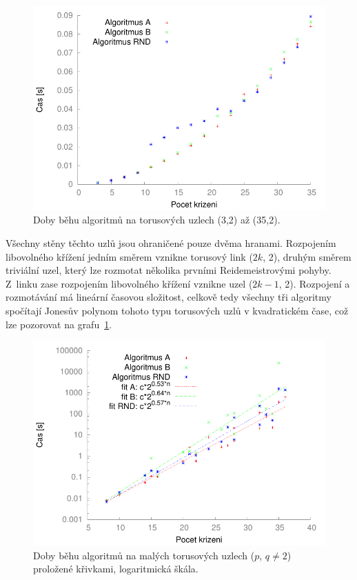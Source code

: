 \begin{figure}[p]\centering
\includegraphics{../img/torus2}
\caption{Doby běhu algoritmů na torusových uzlech (3,2) až (35,2).}
\label{obr03:torus2}
\end{figure}

Všechny stěny těchto uzlů jsou ohraničené pouze dvěma hranami. Rozpojením libovolného křížení jedním směrem vznikne torusový link ($2k$, 2), druhým směrem triviální uzel, který lze rozmotat několika prvními Reidemeistrovými pohyby. Z~linku zase rozpojením libovolného křížení vznikne uzel ($2k-1$, 2). Rozpojení a rozmotávání má lineární časovou složitost, celkově tedy všechny tři algoritmy spočítají Jonesův polynom tohoto typu torusových uzlů v kvadratickém čase, což lze pozorovat na grafu~\ref{obr03:torus2}.

\begin{figure}[p]\centering
\includegraphics{../img/torusNe2FIT}
\caption{Doby běhu algoritmů na malých torusových uzlech ($p$, $q\neq 2$) proložené křivkami, logaritmická škála.}
\label{obr03:torusFIT}
\end{figure}

